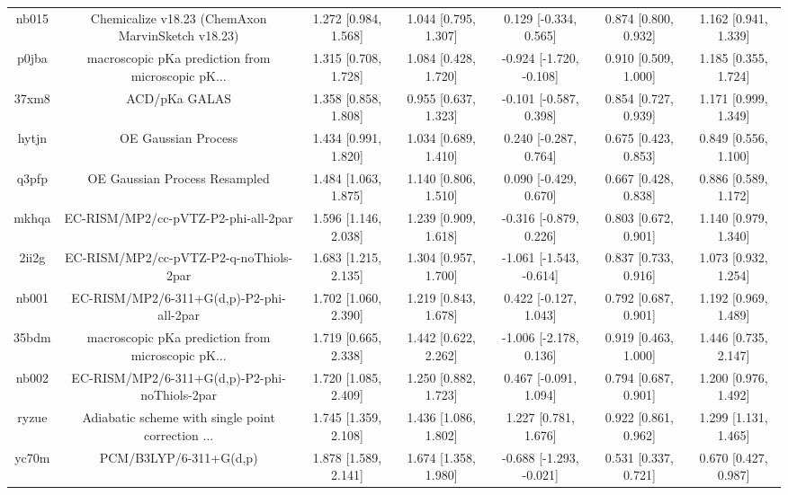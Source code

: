 \documentclass{article}
\begin{document}
\begin{center}
\begin{longtable}{|ccccccc|}
 nb015 &  Chemicalize v18.23 (ChemAxon MarvinSketch v18.23) &  1.272 [0.984, 1.568] &  1.044 [0.795, 1.307] &    0.129 [-0.334, 0.565] &  0.874 [0.800, 0.932] &   1.162 [0.941, 1.339] \\
 p0jba &  macroscopic pKa prediction from microscopic pK... &  1.315 [0.708, 1.728] &  1.084 [0.428, 1.720] &  -0.924 [-1.720, -0.108] &  0.910 [0.509, 1.000] &   1.185 [0.355, 1.724] \\
 37xm8 &                                      ACD/pKa GALAS &  1.358 [0.858, 1.808] &  0.955 [0.637, 1.323] &   -0.101 [-0.587, 0.398] &  0.854 [0.727, 0.939] &   1.171 [0.999, 1.349] \\
 hytjn &                                OE Gaussian Process &  1.434 [0.991, 1.820] &  1.034 [0.689, 1.410] &    0.240 [-0.287, 0.764] &  0.675 [0.423, 0.853] &   0.849 [0.556, 1.100] \\
 q3pfp &                      OE Gaussian Process Resampled &  1.484 [1.063, 1.875] &  1.140 [0.806, 1.510] &    0.090 [-0.429, 0.670] &  0.667 [0.428, 0.838] &   0.886 [0.589, 1.172] \\
 mkhqa &                EC-RISM/MP2/cc-pVTZ-P2-phi-all-2par &  1.596 [1.146, 2.038] &  1.239 [0.909, 1.618] &   -0.316 [-0.879, 0.226] &  0.803 [0.672, 0.901] &   1.140 [0.979, 1.340] \\
 2ii2g &             EC-RISM/MP2/cc-pVTZ-P2-q-noThiols-2par &  1.683 [1.215, 2.135] &  1.304 [0.957, 1.700] &  -1.061 [-1.543, -0.614] &  0.837 [0.733, 0.916] &   1.073 [0.932, 1.254] \\
 nb001 &           EC-RISM/MP2/6-311+G(d,p)-P2-phi-all-2par &  1.702 [1.060, 2.390] &  1.219 [0.843, 1.678] &    0.422 [-0.127, 1.043] &  0.792 [0.687, 0.901] &   1.192 [0.969, 1.489] \\
 35bdm &  macroscopic pKa prediction from microscopic pK... &  1.719 [0.665, 2.338] &  1.442 [0.622, 2.262] &   -1.006 [-2.178, 0.136] &  0.919 [0.463, 1.000] &   1.446 [0.735, 2.147] \\
 nb002 &      EC-RISM/MP2/6-311+G(d,p)-P2-phi-noThiols-2par &  1.720 [1.085, 2.409] &  1.250 [0.882, 1.723] &    0.467 [-0.091, 1.094] &  0.794 [0.687, 0.901] &   1.200 [0.976, 1.492] \\
 ryzue &  Adiabatic scheme with single point correction ... &  1.745 [1.359, 2.108] &  1.436 [1.086, 1.802] &     1.227 [0.781, 1.676] &  0.922 [0.861, 0.962] &   1.299 [1.131, 1.465] \\
 yc70m &                             PCM/B3LYP/6-311+G(d,p) &  1.878 [1.589, 2.141] &  1.674 [1.358, 1.980] &  -0.688 [-1.293, -0.021] &  0.531 [0.337, 0.721] &   0.670 [0.427, 0.987] \\

\end{longtable}
\end{center}
\end{document}
